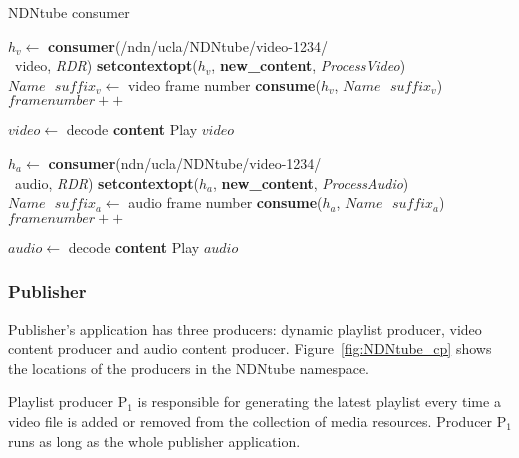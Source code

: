 \begin{algorithm}[ht]
\caption{NDNtube consumer}
\label{alg:recordconsumer}
\begin{algorithmic}[4]
\State $h_v \leftarrow $ \textbf{consumer}(/ndn/ucla/NDNtube/video-1234/ \\\ video, \textit{RDR})
\State \textbf{setcontextopt}($h_v$, \textbf{new\_content}, \textit{ProcessVideo})
\vspace{0.2cm}
	\State $Name \textbf{ } suffix_v \leftarrow $ video frame number
	\State \textbf{consume}($h_v$, $Name\textbf{ }suffix_v$)
	\State $framenumber ++$
	\EndWhile
\vspace{0.2cm}

   \State $video \leftarrow $ decode \textbf{content}
   \State Play $video$
\EndFunction

\vspace{0.4cm}

\State $h_a \leftarrow $ \textbf{consumer}(ndn/ucla/NDNtube/video-1234/ \\\ audio, \textit{RDR})
\State \textbf{setcontextopt}($h_a$, \textbf{new\_content}, \textit{ProcessAudio})
\vspace{0.2cm}
	\State $Name \textbf{ } suffix_a \leftarrow $ audio frame number
	\State \textbf{consume}($h_a$, $Name\textbf{ }suffix_a$)
	\State $framenumber ++$
	\EndWhile
\vspace{0.2cm}

   	\State $audio \leftarrow $ decode \textbf{content}
   	\State Play $audio$
\EndFunction
\end{algorithmic}
\end{algorithm}

\subsubsection{Publisher}
Publisher's application has three producers: dynamic playlist producer, video content producer and audio content producer. Figure~\ref{fig:NDNtube_cp} shows the locations of the producers in the NDNtube namespace.

Playlist producer P$_{\text{1}}$ is responsible for generating the latest playlist every time a video file is added or removed from the collection of media resources. Producer P$_{\text{1}}$ runs as long as the whole publisher application.


